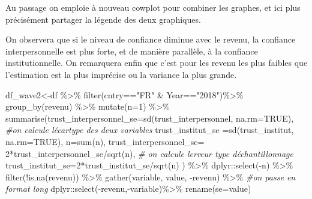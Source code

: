 \documentclass[
]{book}
\newenvironment{Shaded}{\begin{snugshade}}{\end{snugshade}}
\newcommand{\AttributeTok}[1]{\textcolor[rgb]{0.77,0.63,0.00}{#1}}
\newcommand{\CommentTok}[1]{\textcolor[rgb]{0.56,0.35,0.01}{\textit{#1}}}
\newcommand{\ConstantTok}[1]{\textcolor[rgb]{0.00,0.00,0.00}{#1}}
\newcommand{\DecValTok}[1]{\textcolor[rgb]{0.00,0.00,0.81}{#1}}
\newcommand{\FunctionTok}[1]{\textcolor[rgb]{0.00,0.00,0.00}{#1}}
\newcommand{\NormalTok}[1]{#1}
\newcommand{\OtherTok}[1]{\textcolor[rgb]{0.56,0.35,0.01}{#1}}
\newcommand{\SpecialCharTok}[1]{\textcolor[rgb]{0.00,0.00,0.00}{#1}}
\newcommand{\StringTok}[1]{\textcolor[rgb]{0.31,0.60,0.02}{#1}}
\begin{document}
Au passage on emploie à nouveau cowplot pour combiner les graphes, et ici plus précisément partager la légende des deux graphiques.

On observera que si le niveau de confiance diminue avec le revenu, la confiance interpersonnelle est plus forte, et de manière parallèle, à la confiance institutionnelle. On remarquera enfin que c'est pour les revenu les plus faibles que l'estimation est la plus imprécise ou la variance la plus grande.

\begin{Shaded}
\begin{Highlighting}[]
\NormalTok{df\_wave2}\OtherTok{\textless{}{-}}\NormalTok{df }\SpecialCharTok{\%\textgreater{}\%} 
  \FunctionTok{filter}\NormalTok{(cntry}\SpecialCharTok{==}\StringTok{"FR"} \SpecialCharTok{\&}\NormalTok{ Year}\SpecialCharTok{==}\StringTok{"2018"}\NormalTok{)}\SpecialCharTok{\%\textgreater{}\%}
  \FunctionTok{group\_by}\NormalTok{(revenu) }\SpecialCharTok{\%\textgreater{}\%} 
  \FunctionTok{mutate}\NormalTok{(}\AttributeTok{n=}\DecValTok{1}\NormalTok{) }\SpecialCharTok{\%\textgreater{}\%}
  \FunctionTok{summarise}\NormalTok{(}\AttributeTok{trust\_interpersonnel\_se=}\FunctionTok{sd}\NormalTok{(trust\_interpersonnel, }\AttributeTok{na.rm=}\ConstantTok{TRUE}\NormalTok{), }\CommentTok{\#on calcule l\textquotesingle{}écartype des deux variables}
            \AttributeTok{trust\_institut\_se =}\FunctionTok{sd}\NormalTok{(trust\_institut, }\AttributeTok{na.rm=}\ConstantTok{TRUE}\NormalTok{),}
            \AttributeTok{n=}\FunctionTok{sum}\NormalTok{(n),}
            \AttributeTok{trust\_interpersonnel\_se=} \DecValTok{2}\SpecialCharTok{*}\NormalTok{trust\_interpersonnel\_se}\SpecialCharTok{/}\FunctionTok{sqrt}\NormalTok{(n), }\CommentTok{\# on calcule l\textquotesingle{}erreur type d\textquotesingle{}échantillonnage}
            \AttributeTok{trust\_institut\_se=}\DecValTok{2}\SpecialCharTok{*}\NormalTok{trust\_institut\_se}\SpecialCharTok{/}\FunctionTok{sqrt}\NormalTok{(n)}
\NormalTok{            ) }\SpecialCharTok{\%\textgreater{}\%}\NormalTok{ dplyr}\SpecialCharTok{::}\FunctionTok{select}\NormalTok{(}\SpecialCharTok{{-}}\NormalTok{n) }\SpecialCharTok{\%\textgreater{}\%}
  \FunctionTok{filter}\NormalTok{(}\SpecialCharTok{!}\FunctionTok{is.na}\NormalTok{(revenu)) }\SpecialCharTok{\%\textgreater{}\%} 
  \FunctionTok{gather}\NormalTok{(variable, value, }\SpecialCharTok{{-}}\NormalTok{revenu) }\SpecialCharTok{\%\textgreater{}\%} \CommentTok{\#on passe en format long}
\NormalTok{  dplyr}\SpecialCharTok{::}\FunctionTok{select}\NormalTok{(}\SpecialCharTok{{-}}\NormalTok{revenu,}\SpecialCharTok{{-}}\NormalTok{variable)}\SpecialCharTok{\%\textgreater{}\%}
  \FunctionTok{rename}\NormalTok{(}\AttributeTok{se=}\NormalTok{value)}
  

\end{Highlighting}
\end{Shaded}
\end{document}
